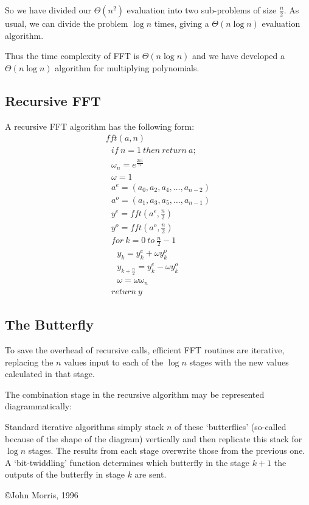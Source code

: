 So we have divided our $\Theta(n^2)$ evaluation into
two sub-problems of size $\frac{n}{2}$.
As usual, we can divide the problem $\log{n}$ times,
giving a  $\Theta(n\log{n})$ evaluation algorithm.

Thus the time complexity of FFT is $\Theta(n\log{n})$ and
we have developed a
$\Theta(n\log{n})$ algorithm for multiplying polynomials.

\subsection{Recursive FFT}

A recursive FFT algorithm has the following form:
\[ 
\begin{array}{l}
fft(a, n) \\
\ \ \ if\ n=1\ then\ return\ a; \\
\ \ \ \omega_n = e^{\frac{2\pi i}{n}} \\
\ \ \ \omega = 1 \\
\ \ \ a^{e} = ( a_0,a_2,a_4,\ldots,a_{n-2}) \\
\ \ \ a^{o} = ( a_1,a_3,a_5,\ldots,a_{n-1}) \\
\ \ \ y^{e} = fft( a^e, \frac{n}{2} ) \\
\ \ \ y^{o} = fft( a^o, \frac{n}{2} ) \\
\ \ \ for\ k = 0\ to\ \frac{n}{2}-1 \\
\ \ \ \ \ \ y_k = y_k^e + \omega y_k^o \\
\ \ \ \ \ \ y_{k+\frac{n}{2}} = y_k^e - \omega y_k^o \\
\ \ \ \ \ \ \omega = \omega \omega_n \\
\ \ \ return\ y
\end{array} \]

\subsection{The Butterfly}

To save the overhead of recursive calls,
efficient FFT routines are iterative,
replacing the $n$ values input to each of the
$\log{n}$ stages with the new values calculated
in that stage.

The combination stage in the recursive algorithm may be
represented diagrammatically:

\begin{center}
\leavevmode
\epsfxsize=8cm
\end{center}

Standard iterative algorithms simply stack $n$ of these
`butterflies' (so-called because of the shape of the
diagram) vertically
and then replicate this stack for $\log{n}$ stages.
The results from each stage overwrite those from the
previous one. 
A `bit-twiddling' function determines which butterfly in
the stage $k+1$ the outputs of the butterfly in
stage $k$ are sent.



\HR

{\small { \copyright John Morris, 1996 } }


